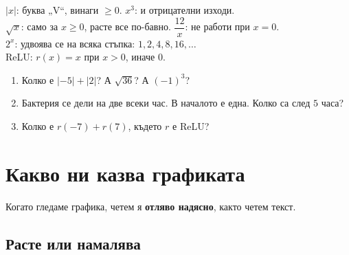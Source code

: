 \documentclass[11pt,a4paper]{article}
\begin{document}
\begin{board}
$|x|$: буква „V“, винаги $\ge 0$. \qquad $x^3$: и отрицателни изходи.\\[2pt]
$\sqrt{x}$: само за $x\ge 0$, расте все по-бавно. \qquad $\dfrac{12}{x}$: не работи при $x=0$.\\[2pt]
$2^x$: удвоява се на всяка стъпка: $1, 2, 4, 8, 16, \dots$\\[2pt]
ReLU: $r(x)=x$ при $x>0$, иначе $0$.
\end{board}

\begin{trybox}
\begin{enumerate}[label=\textbf{\arabic*.},start=14]
  \item Колко е $|{-5}|+|2|$? А $\sqrt{36}$? А $(-1)^3$?
  \item Бактерия се дели на две всеки час. В началото е една. Колко са след $5$ часа?
  \item Колко е $r(-7)+r(7)$, където $r$ е ReLU?
\end{enumerate}
\end{trybox}

\section{Какво ни казва графиката}

Когато гледаме графика, четем я \textbf{отляво надясно}, както четем текст.

\subsection{Расте или намалява}
\end{document}
